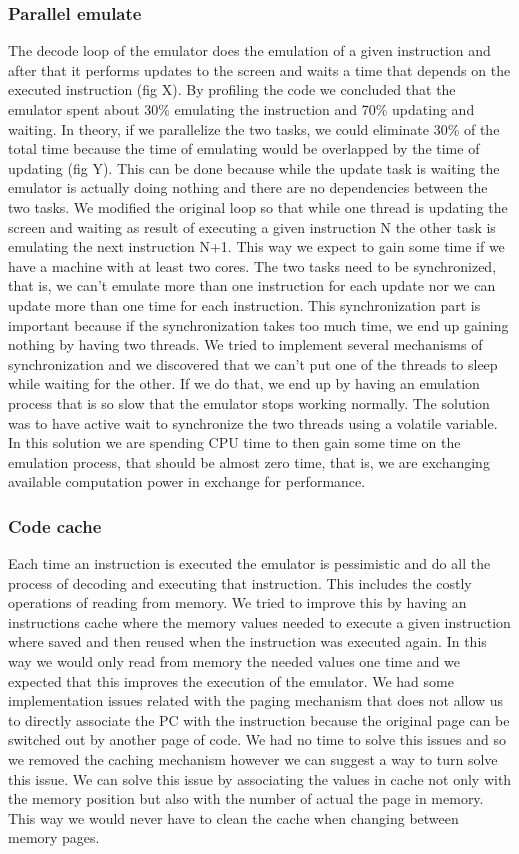 \subsubsection{Parallel emulate}
The decode loop of the emulator does the emulation of a given instruction and after that it performs updates to the screen and waits a time that depends on the executed instruction (fig X). By profiling the code we concluded that the emulator spent about 30\% emulating the instruction and 70\% updating and waiting.
In theory, if we parallelize the two tasks, we could eliminate 30\% of the total time because the time of emulating would be overlapped by the time of updating (fig Y). This can be done because while the update task is waiting the emulator is actually doing nothing and there are no dependencies between the two tasks.
We modified the original loop so that while one thread is updating the screen and waiting as result of executing a given instruction N the other task is emulating the next instruction N+1. This way we expect to gain some time if we have a machine with at least two cores.
The two tasks need to be synchronized, that is, we can't emulate more than one instruction for each update nor we can update more than one time for each instruction. This synchronization part is important because if the synchronization takes too much time, we end up gaining nothing by having two threads. We tried to implement several mechanisms of synchronization and we discovered that we can't put one of the threads to sleep while waiting for the other. If we do that, we end up by having an emulation process that is so slow that the emulator stops working normally. The solution was to have active wait to synchronize the two threads using a volatile variable. In this solution we are spending CPU time to then gain some time on the emulation process, that should be almost zero time, that is, we are exchanging available computation power in exchange for performance.

\subsubsection{Code cache}
Each time an instruction is executed the emulator is pessimistic and do all the process of decoding and executing that instruction. This includes the costly operations of reading from memory. We tried to improve this by having an instructions cache where the memory values needed to execute a given instruction where saved and then reused when the instruction was executed again. In this way we would only read from memory the needed values one time and we expected that this improves the execution of the emulator. We had some implementation issues related with the paging mechanism that does not allow us to directly associate the PC with the instruction because the original page can be switched out by another page of code. We had no time to solve this issues and so we removed the caching mechanism however we can suggest a way to turn solve this issue.
We can solve this issue by associating the values in cache not only with the memory position but also with the number of actual the page in memory. This way we would never have to clean the cache when changing between memory pages.
